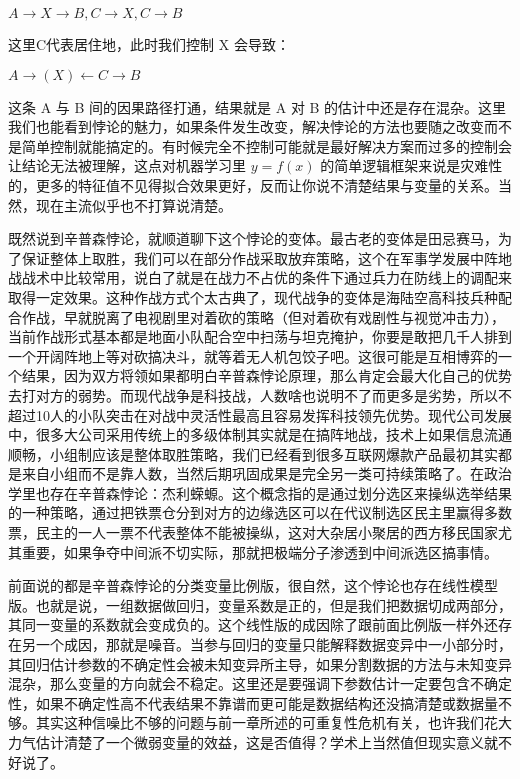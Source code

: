 \documentclass[]{tufte-book}
\begin{document}
\(A \rightarrow X\rightarrow B, C \rightarrow X, C \rightarrow B\)

这里C代表居住地，此时我们控制 X 会导致：

\(A \rightarrow (X) \leftarrow C \rightarrow B\)

这条 A 与 B 间的因果路径打通，结果就是 A 对 B 的估计中还是存在混杂。这里我们也能看到悖论的魅力，如果条件发生改变，解决悖论的方法也要随之改变而不是简单控制就能搞定的。有时候完全不控制可能就是最好解决方案而过多的控制会让结论无法被理解，这点对机器学习里 \(y = f(x)\) 的简单逻辑框架来说是灾难性的，更多的特征值不见得拟合效果更好，反而让你说不清楚结果与变量的关系。当然，现在主流似乎也不打算说清楚。

既然说到辛普森悖论，就顺道聊下这个悖论的变体。最古老的变体是田忌赛马，为了保证整体上取胜，我们可以在部分作战采取放弃策略，这个在军事学发展中阵地战战术中比较常用，说白了就是在战力不占优的条件下通过兵力在防线上的调配来取得一定效果。这种作战方式个太古典了，现代战争的变体是海陆空高科技兵种配合作战，早就脱离了电视剧里对着砍的策略（但对着砍有戏剧性与视觉冲击力），当前作战形式基本都是地面小队配合空中扫荡与坦克掩护，你要是敢把几千人排到一个开阔阵地上等对砍搞决斗，就等着无人机包饺子吧。这很可能是互相博弈的一个结果，因为双方将领如果都明白辛普森悖论原理，那么肯定会最大化自己的优势去打对方的弱势。而现代战争是科技战，人数啥也说明不了而更多是劣势，所以不超过10人的小队突击在对战中灵活性最高且容易发挥科技领先优势。现代公司发展中，很多大公司采用传统上的多级体制其实就是在搞阵地战，技术上如果信息流通顺畅，小组制应该是整体取胜策略，我们已经看到很多互联网爆款产品最初其实都是来自小组而不是靠人数，当然后期巩固成果是完全另一类可持续策略了。在政治学里也存在辛普森悖论：杰利蝾螈。这个概念指的是通过划分选区来操纵选举结果的一种策略，通过把铁票仓分到对方的边缘选区可以在代议制选区民主里赢得多数票，民主的一人一票不代表整体不能被操纵，这对大杂居小聚居的西方移民国家尤其重要，如果争夺中间派不切实际，那就把极端分子渗透到中间派选区搞事情。

前面说的都是辛普森悖论的分类变量比例版，很自然，这个悖论也存在线性模型版。也就是说，一组数据做回归，变量系数是正的，但是我们把数据切成两部分，其同一变量的系数就会变成负的。这个线性版的成因除了跟前面比例版一样外还存在另一个成因，那就是噪音。当参与回归的变量只能解释数据变异中一小部分时，其回归估计参数的不确定性会被未知变异所主导，如果分割数据的方法与未知变异混杂，那么变量的方向就会不稳定。这里还是要强调下参数估计一定要包含不确定性，如果不确定性高不代表结果不靠谱而更可能是数据结构还没搞清楚或数据量不够。其实这种信噪比不够的问题与前一章所述的可重复性危机有关，也许我们花大力气估计清楚了一个微弱变量的效益，这是否值得？学术上当然值但现实意义就不好说了。
\end{document}
